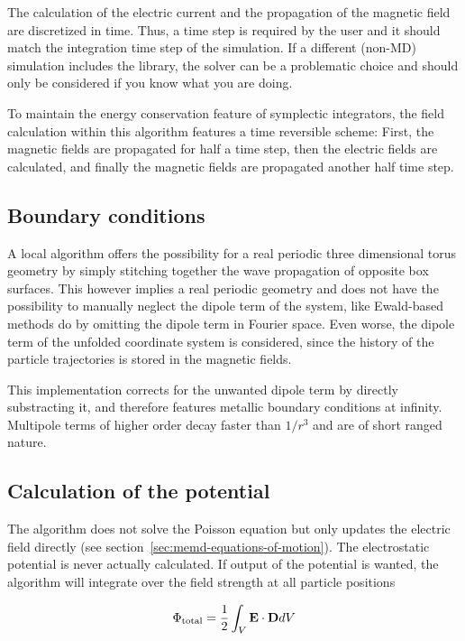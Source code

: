 The calculation of the electric current and the propagation of the magnetic field are discretized in time. Thus, a time step is required by the user and it should match the integration time step of the simulation. If a different (non-MD) simulation includes the \project{} library, the \memd{} solver can be a problematic choice and should only be considered if you know what you are doing.

To maintain the energy conservation feature of symplectic integrators, the field calculation within this algorithm features a time reversible scheme: First, the magnetic fields are propagated for half a time step, then the electric fields are calculated, and finally the magnetic fields are propagated another half time step.


\subsection{Boundary conditions}
\label{sec:memd-boundaries}

A local algorithm offers the possibility for a real periodic three dimensional torus geometry by simply stitching together the wave propagation of opposite box surfaces. This however implies a real periodic geometry and does not have the possibility to manually neglect the dipole term of the system, like \eg{} Ewald-based methods do by omitting the dipole term in Fourier space. Even worse, the dipole term of the unfolded coordinate system is considered, since the history of the particle trajectories is stored in the magnetic fields.

This implementation corrects for the unwanted dipole term by directly substracting it, and therefore features metallic boundary conditions at infinity. Multipole terms of higher order decay faster than $1/r^3$ and are of short ranged nature.

\subsection{Calculation of the potential}
\label{sec:memd-potential}

The \memd{} algorithm does not solve the Poisson equation but only updates the electric field directly (see section~\ref{sec:memd-equations-of-motion}). The electrostatic potential is never actually calculated. If output of the potential is wanted, the \memd{} algorithm will integrate over the field strength at all particle positions

\begin{equation}
\Phi_\text{total} = \frac{1}{2}\int_{V}\mathbf{E}\cdot\mathbf{D}dV
\end{equation}

